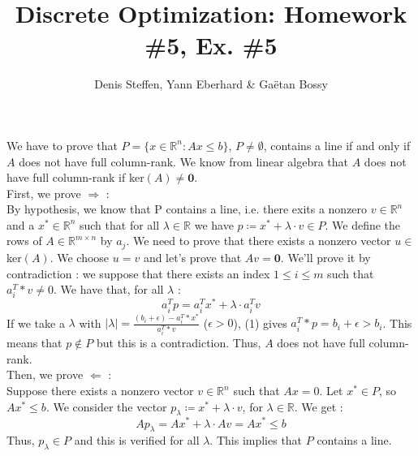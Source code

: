 \documentclass[a4paper,11pt,french]{article}
\title{Discrete Optimization: Homework \#5, Ex. \#5}
\author{Denis Steffen, Yann Eberhard \& Gaëtan Bossy}
\begin{document}
    
    \maketitle
    
    We have to prove that $P = \{ x \in \mathbb{R}^n : Ax \leq b\}$, $P \not = \emptyset $, contains a line if and only if $A$ does not have full column-rank.
    We know from linear algebra that $A$ does not have full column-rank if ker$(A) \not = \mathbf {0}$. 
\\

    First, we prove  $\Rightarrow$ : \\
    By hypothesis, we know that P contains a line, i.e. there exits a nonzero $v \in \mathbb{R}^n$ and a $x^* \in \mathbb{R}^n$ such that for all $\lambda \in \mathbb{R}$ we have $ p \coloneqq x^* + \lambda \cdot v \in P$. 
    We define the rows of $A \in \mathbb{R}^{m \times n}$ by $a_j$.
    We need to prove that there exists a nonzero vector $u \in$ ker$(A)$. We choose $u = v$ and let's prove that $Av = \mathbf 0$.  
    We'll prove it by contradiction : we suppose that there exists an index $1 \leq i \leq m$ such that $a_i^T*v \not = 0$. We have that, for all $\lambda$ : 
    \begin{equation}
        a_i^Tp = a_i^Tx^* + \lambda \cdot a_i^Tv
    \end{equation}
    If we take a $\lambda$ with $\left| \lambda \right| = \frac{ (b_i  + \epsilon) - a_i^T*x^*}{a_i^T*v} $ ($\epsilon > 0$), (1) gives $a_i^T*p = b_i + \epsilon > b_i$. 
    This means that $p \not \in P$ but this is a contradiction. Thus, $A$ does not have full column-rank.
    \\

    Then, we prove $\Leftarrow$ : 
    \\ Suppose there exists a nonzero vector $v \in \mathbb{R}^n$ such that $Ax = 0$. 
    Let $x^* \in P$, so $Ax^* \leq b$. We consider the vector $p_\lambda \coloneqq x^* + \lambda \cdot v$, for $\lambda \in \mathbb{R}$. 
    We get : 
    \begin{equation*}
        Ap_\lambda = Ax^* + \lambda \cdot Av = Ax^* \leq b
    \end{equation*}
    Thus, $p_\lambda \in P$ and this is verified for all $\lambda$. This implies that $P$ contains a line.

    
    
\end{document}
